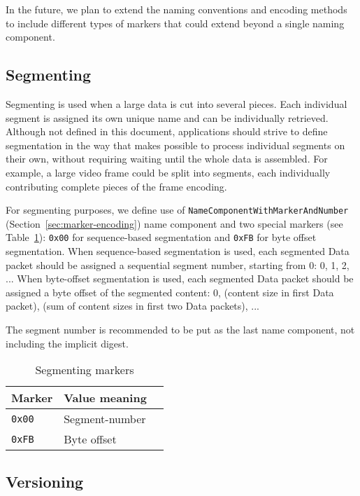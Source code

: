 In the future, we plan to extend the naming conventions and encoding methods to include different types of markers that could extend beyond a single naming component.

\subsection{Segmenting}
\label{sec:segmenting}

Segmenting is used when a large data is cut into several pieces.
Each individual segment is assigned its own unique name and can be individually retrieved.
Although not defined in this document, applications should strive to define segmentation in the way that makes possible to process individual segments on their own, without requiring waiting until the whole data is assembled.
For example, a large video frame could be split into segments, each individually contributing complete pieces of the frame encoding.

For segmenting purposes, we define use of \texttt{NameComponentWithMarkerAndNumber} (Section~\ref{sec:marker-encoding}) name component and two special markers (see Table~\ref{tab:segmenting}): \verb|0x00| for sequence-based segmentation and \verb|0xFB| for byte offset segmentation.
When sequence-based segmentation is used, each segmented Data packet should be assigned a sequential segment number, starting from 0: 0, 1, 2, ...
When byte-offset segmentation is used, each segmented Data packet should be assigned a byte offset of the segmented content: 0, (content size in first Data packet), (sum of content sizes in first two Data packets), ...

The segment number is recommended to be put as the last name component, not including the implicit digest.

\begin{table}[h!]
  \centering
  \caption{Segmenting markers}
  \label{tab:segmenting}
  \begin{tabular}{|l|l|l|}
    \hline
    Marker & Value meaning \\
    \hline \hline
    \verb|0x00| & Segment-number \\
    \verb|0xFB| & Byte offset \\
    \hline
  \end{tabular}
\end{table}

\subsection{Versioning}
\label{sec:version}


